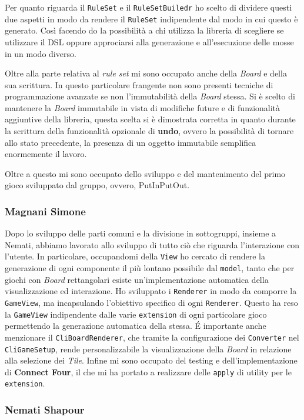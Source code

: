 Per quanto riguarda il \texttt{RuleSet} e il \texttt{RuleSetBuiledr} ho scelto di dividere questi due aspetti in modo da rendere il \texttt{RuleSet} indipendente dal modo in cui questo è generato.
%
Così facendo do la possibilità a chi utilizza la libreria di scegliere se utilizzare il DSL oppure approciarsi alla generazione e all'esecuzione delle mosse in un modo diverso.

Oltre alla parte relativa al \textit{rule set} mi sono occupato anche della \textit{Board} e della sua scrittura.
%
In questo particolare frangente non sono presenti tecniche di programmazione avanzate se non l'immutabilità della \textit{Board} stessa.
%
Si è scelto di mantenere la \textit{Board} immutabile in vista di modifiche future e di funzionalità aggiuntive della libreria, questa scelta si è dimostrata corretta in quanto durante la scrittura della funzionalità opzionale di \textbf{undo}, ovvero la possibilità di tornare allo stato precedente, la presenza di un oggetto immutabile semplifica enormemente il lavoro.

Oltre a questo mi sono occupato dello sviluppo e del mantenimento del primo gioco sviluppato dal gruppo, ovvero, PutInPutOut.


\subsubsection{Magnani Simone}
Dopo lo sviluppo delle parti comuni e la divisione in sottogruppi, insieme a Nemati, abbiamo lavorato allo sviluppo di tutto ciò che riguarda l'interazione con l'utente.
In particolare, occupandomi della \texttt{View} ho cercato di rendere la generazione di ogni componente il più lontano possibile dal \texttt{model}, tanto che per giochi con \textit{Board} rettangolari esiste un'implementazione automatica della visualizzazione ed interazione.
Ho sviluppato i \texttt{Renderer} in modo da comporre la \texttt{GameView}, ma incapsulando l'obiettivo specifico di ogni \texttt{Renderer}.
%
Questo ha reso la \texttt{GameView} indipendente dalle varie \texttt{extension} di ogni particolare gioco permettendo la generazione automatica della stessa.
%
\'E importante anche menzionare il \texttt{CliBoardRenderer}, che tramite la configurazione dei \texttt{Converter} nel \texttt{CliGameSetup}, rende personalizzabile la visualizzazione della \textit{Board} in relazione alla selezione dei \textit{Tile}.
Infine mi sono occupato del testing e dell'implementazione di \textbf{Connect Four}, il che mi ha portato a realizzare delle \texttt{apply} di utility per le \texttt{extension}.

\subsubsection{Nemati Shapour}
